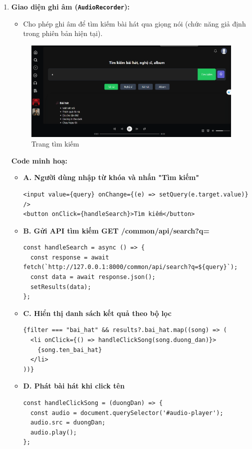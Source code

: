\begin{enumerate}
  \item \textbf{Giao diện ghi âm (\texttt{AudioRecorder}):}
  \begin{itemize}
    \item Cho phép ghi âm để tìm kiếm bài hát qua giọng nói
    (chức năng giả định trong phiên bản hiện tại).
  \end{itemize}
  \begin{figure}[H]
    \centering
    \includegraphics[width=1\textwidth]{imgs/trienkhaife/search.png}
    \caption{Trang tìm kiếm}
  \end{figure}
  \textbf{Code minh hoạ:}

\begin{itemize}
  \item \textbf{A. Người dùng nhập từ khóa và nhấn "Tìm kiếm"}
\begin{verbatim}
<input value={query} onChange={(e) => setQuery(e.target.value)} />
<button onClick={handleSearch}>Tìm kiếm</button>
\end{verbatim}

  \item \textbf{B. Gửi API tìm kiếm GET /common/api/search?q=}
\begin{verbatim}
const handleSearch = async () => {
  const response = await fetch(`http://127.0.0.1:8000/common/api/search?q=${query}`);
  const data = await response.json();
  setResults(data);
};
\end{verbatim}

  \item \textbf{C. Hiển thị danh sách kết quả theo bộ lọc}
\begin{verbatim}
{filter === "bai_hat" && results?.bai_hat.map((song) => (
  <li onClick={() => handleClickSong(song.duong_dan)}>
    {song.ten_bai_hat}
  </li>
))}
\end{verbatim}

  \item \textbf{D. Phát bài hát khi click tên}
\begin{verbatim}
const handleClickSong = (duongDan) => {
  const audio = document.querySelector('#audio-player');
  audio.src = duongDan;
  audio.play();
};
\end{verbatim}


\end{itemize}
\end{enumerate}
